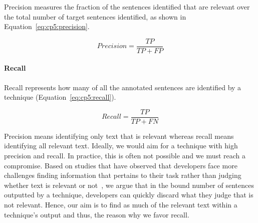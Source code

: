Precision measures the fraction of the sentences identified that are relevant over the total number of target sentences identified, as shown in Equation~\ref{eq:cp5:precision}.



\begin{equation}
\label{eq:cp5:precision}    
    Precision = \frac{TP}{TP + FP}
\end{equation}



\paragraph{\textbf{Recall}} Recall represents how many of all the annotated sentences are identified by a technique (Equation~\ref{eq:cp5:recall}).


\begin{equation}
\label{eq:cp5:recall}        
    Recall = \frac{TP}{TP + FN}
\end{equation}



\medskip
Precision means identifying only text that is relevant whereas recall means identifying all relevant text.
Ideally, we would aim for a technique with high precision and recall. In practice, this is often not possible and we must reach a compromise.
Based on studies that have observed that developers face more challenges finding information that pertains to their task rather than judging whether text is relevant or not~\cite{Robillard2015, Maalej2013}, we argue that in the bound number of sentences outputted by a technique, developers can quickly discard what they judge that is not relevant. Hence, our aim is to find as much of the relevant text within a technique's output and thus, the reason why we favor recall.











